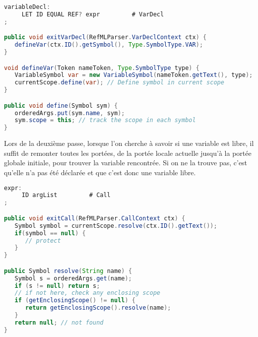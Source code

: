 \documentclass[11pt, a4paper, notitlepage]{article}
\newcommand\tab{{\hspace*{12.5mm}}}
\begin{document}
\begin{lstlisting}[language=java]
variableDecl:
     LET ID EQUAL REF? expr         # VarDecl
;

public void exitVarDecl(RefMLParser.VarDeclContext ctx) {
   defineVar(ctx.ID().getSymbol(), Type.SymbolType.VAR);
}

void defineVar(Token nameToken, Type.SymbolType type) {
   VariableSymbol var = new VariableSymbol(nameToken.getText(), type);
   currentScope.define(var); // Define symbol in current scope
}

public void define(Symbol sym) {
   orderedArgs.put(sym.name, sym);
   sym.scope = this; // track the scope in each symbol
}
\end{lstlisting}

\tab Lors de la deuxième passe, lorsque l'on cherche à savoir si une variable est libre, il suffit de remonter toutes les portées, de la portée locale actuelle jusqu'à la portée globale initiale, pour trouver la variable rencontrée. Si on ne la trouve pas, c'est qu'elle n'a pas été déclarée et que c'est donc une variable libre.

\begin{lstlisting}[language=java]
expr:
     ID argList         # Call
;

public void exitCall(RefMLParser.CallContext ctx) {
   Symbol symbol = currentScope.resolve(ctx.ID().getText());
   if(symbol == null) {
      // protect
   }
}

public Symbol resolve(String name) {
   Symbol s = orderedArgs.get(name);
   if (s != null) return s;
   // if not here, check any enclosing scope
   if (getEnclosingScope() != null) {
      return getEnclosingScope().resolve(name);
   }
   return null; // not found
}
\end{lstlisting}
\end{document}

